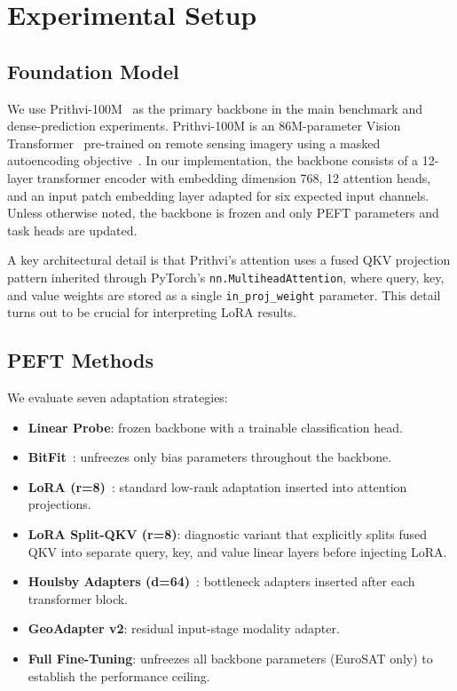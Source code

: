 \section{Experimental Setup}

\subsection{Foundation Model}
We use Prithvi-100M~\cite{jakubik2023prithvi} as the primary backbone in the main benchmark and dense-prediction experiments. Prithvi-100M is an 86M-parameter Vision Transformer~\cite{dosovitskiy2021vit} pre-trained on remote sensing imagery using a masked autoencoding objective~\cite{he2022mae}. In our implementation, the backbone consists of a 12-layer transformer encoder with embedding dimension 768, 12 attention heads, and an input patch embedding layer adapted for six expected input channels. Unless otherwise noted, the backbone is frozen and only PEFT parameters and task heads are updated.

A key architectural detail is that Prithvi's attention uses a fused QKV projection pattern inherited through PyTorch's \texttt{nn.MultiheadAttention}, where query, key, and value weights are stored as a single \texttt{in\_proj\_weight} parameter. This detail turns out to be crucial for interpreting LoRA results.

\subsection{PEFT Methods}
We evaluate seven adaptation strategies:
\begin{itemize}[leftmargin=1.5em]
    \item \textbf{Linear Probe}: frozen backbone with a trainable classification head.
    \item \textbf{BitFit}~\cite{zaken2022bitfit}: unfreezes only bias parameters throughout the backbone.
    \item \textbf{LoRA (r=8)}~\cite{hu2022lora}: standard low-rank adaptation inserted into attention projections.
    \item \textbf{LoRA Split-QKV (r=8)}: diagnostic variant that explicitly splits fused QKV into separate query, key, and value linear layers before injecting LoRA.
    \item \textbf{Houlsby Adapters (d=64)}~\cite{houlsby2019adapter}: bottleneck adapters inserted after each transformer block.
    \item \textbf{GeoAdapter v2}: residual input-stage modality adapter.
    \item \textbf{Full Fine-Tuning}: unfreezes all backbone parameters (EuroSAT only) to establish the performance ceiling.
\end{itemize}

